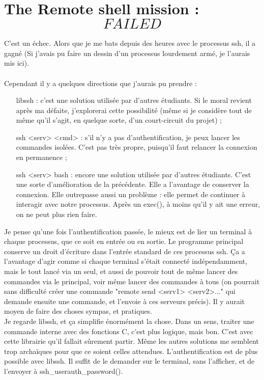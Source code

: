 \chapter[Remote shell FAILED]{The Remote shell mission : \[FAILED\]}
C'est un échec. Alors que je me bats depuis des heures avec le processus ssh, il a gagné (Si j'avais pu faire un dessin d'un processus lourdement armé, je l'aurais mis ici).
\\\\
Cependant il y a quelques directions que j'aurais pu prendre :
\\\begin{itemize}
\item[libssh :] c'est une solution utilisée par d'autres étudiants. Si le moral revient après ma défaite, j'explorerai cette possibilité (même si je considère tout de même qu'il s'agit, en quelque sorte, d'un court-circuit du projet) ;
\item[ssh <serv> <cmd> :] s'il n'y a pas d'authentification, je peux lancer les commandes isolées. C'est pas très propre, puisqu'il faut relancer la connexion en permanence ;
\item[ssh <serv> bash :] encore une solution utilisée par d'autres étudiants. C'est une sorte d'amélioration de la précédente. Elle a l'avantage de conserver la connexion. Elle outrepasse aussi un problème : elle permet de continuer à interagir avec notre processus. Après un exec(), à moins qu'il y ait une erreur, on ne peut plus rien faire.
\\\end{itemize}
Je pense qu'une fois l'authentification passée, le mieux est de lier un terminal à chaque processus, que ce soit en entrée ou en sortie. Le programme principal conserve un droit d'écriture dans l'entrée standard de ces processus ssh. Ça a l'avantage d'agir comme si chaque terminal s'était connecté indépendamment, mais le tout lancé via un seul, et aussi de pouvoir tout de même lancer des commandes via le principal, voir même lancer des commandes à tous (on pourrait sans difficulté créer une commande "remote send <serv1> <serv2>..." qui demande ensuite une commande, et l'envoie à ces serveurs précis). Il y aurait moyen de faire des choses sympas, et pratiques.
\\Je regarde libssh, et ça simplifie énormément la chose. Dans un sens, traiter une commande interne avec des fonctions C, c'est plus logique, mais bon. C'est avec cette librairie qu'il fallait sûrement partir. Même les autres solutions me semblent trop archaïques pour que ce soient celles attendues. L'authentification est de plus possible avec libssh. Il suffit de le demander sur le terminal, sans l'afficher, et de l'envoyer à ssh\_userauth\_password().
